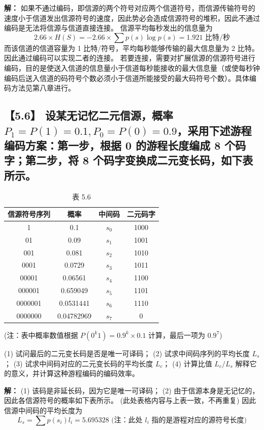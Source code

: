 \documentclass[11pt, a4paper]{article}
\begin{document}
\textbf{解：}
如果不通过编码，即信源的两个符号对应两个信道符号，而信源传输符号的速度小于信道发出信源符号的速度，因此势必会造成信源符号的堆积，因此不通过编码是无法将信源与信道直接连接。
信源平均每秒发出的信息量为
\[ 2.66 \times H(S) = -2.66 \times \sum p(s) \log p(s) = 1.921 \text{ 比特/秒} \]
而该信道的信道容量为 1 比特/符号，平均每秒能够传输的最大信息量为 2 比特。
因此通过编码可以实现二者的连接。
若要连接，需要对扩展信源的信源符号进行编码，目的是使送入信道的信息量小于信道每秒能接收的最大信息量（或使每秒钟编码后送入信道的码符号个数必须小于信道所能接受的最大码符号个数）。具体编码方法见第八章进行。

\subsection*{【5.6】 设某无记忆二元信源，概率 $P_1=P(1)=0.1, P_0=P(0)=0.9$，采用下述游程编码方案：第一步，根据 0 的游程长度编成 8 个码字；第二步，将 8 个码字变换成二元变长码，如下表所示。}

\begin{table}[h]
\centering
\caption{表 5.6}
\begin{tabular}{c|c|c|c}
\toprule
信源符号序列 & 概率 & 中间码 & 二元码字 \\
\midrule
1 & 0.1 & $s_0$ & 1000 \\
01 & 0.09 & $s_1$ & 1001 \\
001 & 0.081 & $s_2$ & 1010 \\
0001 & 0.0729 & $s_3$ & 1011 \\
00001 & 0.06561 & $s_4$ & 1100 \\
000001 & 0.659049 & $s_5$ & 1101 \\
0000001 & 0.0531441 & $s_6$ & 1110 \\
0000000 & 0.04782969 & $s_7$ & 0 \\
\bottomrule
\end{tabular}
\end{table}
(注：表中概率数值根据 $P(0^k 1) = 0.9^k \times 0.1$ 计算，最后一项为 $0.9^7$)

(1) 试问最后的二元变长码是否是唯一可译码；
(2) 试求中间码序列的平均长度 $L_s$；
(3) 试求中间码对应的二元变长码的平均长度 $L_c$；
(4) 计算比值 $L_c/L_s$ 解释它的意义，并计算这种游程编码的编码效率。

\textbf{解：}
(1) 该码是非延长码，因为它是唯一可译码；
(2) 由于信源本身是无记忆的，因此各信源符号的概率如下表所示。
(此处表格内容与上表一致，不再重复)
因此信源中间码的平均长度为
\[ L_s = \sum p(s_i) l_i = 5.695328 \text{ (注：此处 $l_i$ 指的是游程对应的源符号长度)} \]
\end{document}
